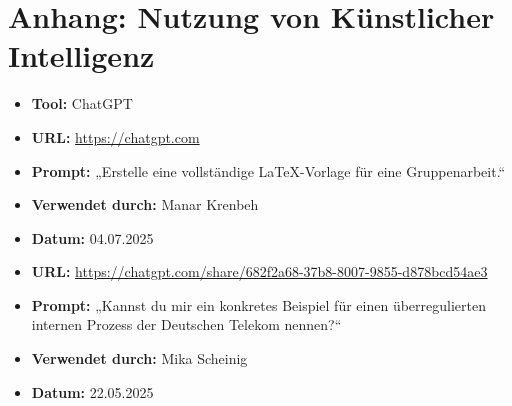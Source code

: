 \documentclass[12pt,a4paper]{article}
\begin{document}
	\section{Anhang: Nutzung von Künstlicher Intelligenz}
	\begin{itemize}
		\item \textbf{Tool:} ChatGPT
		\item \textbf{URL:} \url{https://chatgpt.com}
		\item \textbf{Prompt:} „Erstelle eine vollständige LaTeX-Vorlage für eine Gruppenarbeit.“
		\item \textbf{Verwendet durch:} Manar Krenbeh
		\item \textbf{Datum:} 04.07.2025
	\end{itemize}
	\begin{itemize}
		\item \textbf{URL:} \url{https://chatgpt.com/share/682f2a68-37b8-8007-9855-d878bcd54ae3}
		\item \textbf{Prompt:} „Kannst du mir ein konkretes Beispiel für einen überregulierten internen Prozess der Deutschen Telekom nennen?“
		\item \textbf{Verwendet durch:} Mika Scheinig
		\item \textbf{Datum:} 22.05.2025
	\end{itemize}
	
\end{document}
